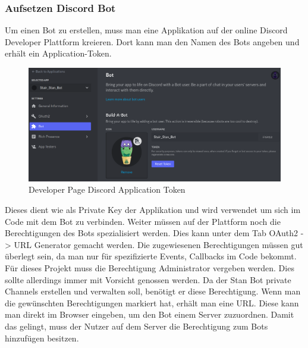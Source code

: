\documentclass[a4paper, table]{article}
\begin{document}
\subsubsection{Aufsetzen Discord Bot}
Um einen Bot zu erstellen, muss man eine Applikation auf der online Discord Developer Plattform kreieren.
Dort kann man den Namen des Bots angeben und erhält ein Application-Token.
\begin{figure}[h]
    \centering
    \includegraphics[width=1\textwidth]{img/discord_developer_bot.png}
    \caption{Developer Page Discord Application Token}
    \label{fig:delevoper-application-token}
\end{figure}
Dieses dient wie als Private Key der Applikation und wird verwendet um sich im Code mit dem Bot zu verbinden.
Weiter müssen auf der Plattform noch die Berechtigungen des Bots spezialisiert werden.
Dies kann unter dem Tab OAuth2 -> URL Generator gemacht werden.
Die zugewiesenen Berechtigungen müssen gut überlegt sein, da man nur für spezifizierte Events, Callbacks im Code bekommt.
Für dieses Projekt muss die Berechtigung Administrator vergeben werden.
Dies sollte allerdings immer mit Vorsicht genossen werden.
Da der Stan Bot private Channels erstellen und verwalten soll, benötigt er diese Berechtigung.
Wenn man die gewünschten Berechtigungen markiert hat, erhält man eine URL.
Diese kann man direkt im Browser eingeben, um den Bot einem Server zuzuordnen.
Damit das gelingt, muss der Nutzer auf dem Server die Berechtigung zum Bots hinzufügen besitzen. 
\end{document}
